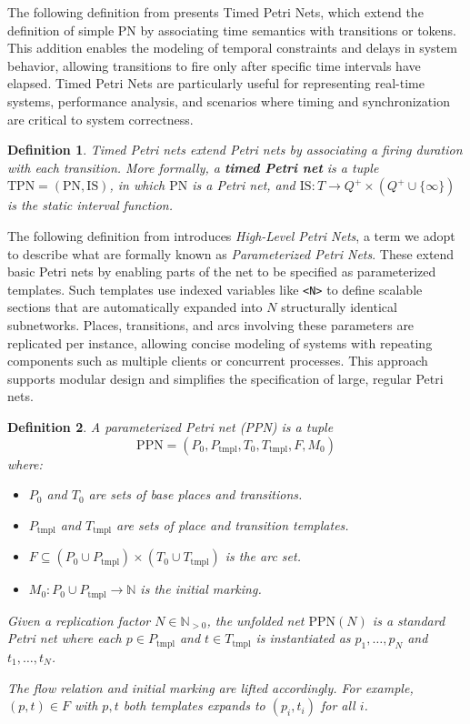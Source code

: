 \documentclass[12pt]{article}
\newtheorem{definition}{Definition}
\begin{document}
    The following definition from \cite{diaz2013petri} presents Timed Petri Nets, which extend the definition of simple PN by associating time semantics with transitions or tokens. This addition enables the modeling of temporal constraints and delays in system behavior, allowing transitions to fire only after specific time intervals have elapsed. Timed Petri Nets are particularly useful for representing real-time systems, performance analysis, and scenarios where timing and synchronization are critical to system correctness.
    \begin{definition}
        Timed Petri nets extend Petri nets by associating a firing duration with each transition. More formally, a \textbf{timed Petri net} is a tuple $\mathrm{TPN}=(\mathrm{PN},\mathrm{IS})$, in which $\mathrm{PN}$ is a Petri net, and $\mathrm{IS}:T\rightarrow Q^+ \times (Q^+ \cup \{\infty\})$ is the static interval function. 
    \end{definition}
        
    The following definition from \cite{diaz2013petri} introduces \emph{High-Level Petri Nets}, a term we adopt to describe what are formally known as \emph{Parameterized Petri Nets}. These extend basic Petri nets by enabling parts of the net to be specified as parameterized templates. Such templates use indexed variables like \texttt{<N>} to define scalable sections that are automatically expanded into $N$ structurally identical subnetworks. Places, transitions, and arcs involving these parameters are replicated per instance, allowing concise modeling of systems with repeating components such as multiple clients or concurrent processes. This approach supports modular design and simplifies the specification of large, regular Petri nets.
    \begin{definition}
        A \emph{parameterized Petri net (PPN)} is a tuple
\[
\mathrm{PPN} = (P_0, P_{\mathrm{tmpl}}, T_0, T_{\mathrm{tmpl}}, F, M_0)
\]
where:
\begin{itemize}
    \item $P_0$ and $T_0$ are sets of base places and transitions.
    \item $P_{\mathrm{tmpl}}$ and $T_{\mathrm{tmpl}}$ are sets of place and transition templates.
    \item $F \subseteq (P_0 \cup P_{\mathrm{tmpl}}) \times (T_0 \cup T_{\mathrm{tmpl}})$ is the arc set.
    \item $M_0 : P_0 \cup P_{\mathrm{tmpl}} \to \mathbb{N}$ is the initial marking.
\end{itemize}

Given a replication factor $N \in \mathbb{N}_{>0}$, the unfolded net $\mathrm{PPN}(N)$ is a standard Petri net where each $p \in P_{\mathrm{tmpl}}$ and $t \in T_{\mathrm{tmpl}}$ is instantiated as $p_1, \dots, p_N$ and $t_1, \dots, t_N$.

The flow relation and initial marking are lifted accordingly. For example, $(p, t) \in F$ with $p, t$ both templates expands to $(p_i, t_i)$ for all $i$.

    \end{definition}
\end{document}
